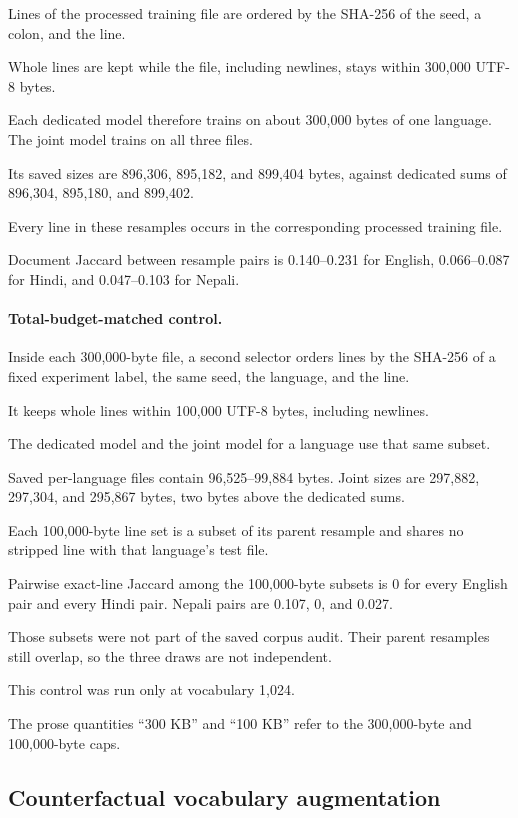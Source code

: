 \documentclass[10pt,twocolumn]{article}
\begin{document}
Lines of the processed training file are ordered by
the SHA-256 of the seed, a colon, and the line.

Whole lines are kept while the file, including newlines,
stays within 300,000 UTF-8 bytes.

Each dedicated model therefore trains on about
300,000 bytes of one language. The joint model trains
on all three files.

Its saved sizes are 896,306, 895,182, and 899,404
bytes, against dedicated sums of 896,304, 895,180,
and 899,402.

Every line in these resamples occurs in the corresponding
processed training file.

Document Jaccard between resample pairs is 0.140--0.231
for English, 0.066--0.087 for Hindi, and 0.047--0.103
for Nepali.

\paragraph{Total-budget-matched control.}

Inside each 300,000-byte file, a second selector orders
lines by the SHA-256 of a fixed experiment label, the
same seed, the language, and the line.

It keeps whole lines within 100,000 UTF-8 bytes,
including newlines.

The dedicated model and the joint model for a language
use that same subset.

Saved per-language files contain 96,525--99,884 bytes.
Joint sizes are 297,882, 297,304, and 295,867 bytes,
two bytes above the dedicated sums.

Each 100,000-byte line set is a subset of its parent
resample and shares no stripped line with that language's
test file.

Pairwise exact-line Jaccard among the 100,000-byte
subsets is 0 for every English pair and every Hindi pair.
Nepali pairs are 0.107, 0, and 0.027.

Those subsets were not part of the saved corpus audit.
Their parent resamples still overlap, so the three draws
are not independent.

This control was run only at vocabulary 1,024.

The prose quantities ``300 KB'' and ``100 KB'' refer
to the 300,000-byte and 100,000-byte caps.

\subsection{Counterfactual vocabulary augmentation}
\end{document}
